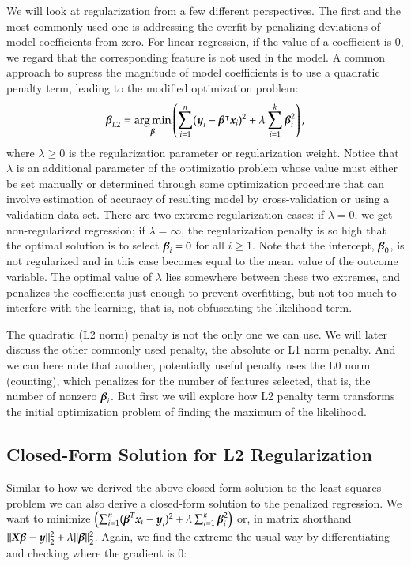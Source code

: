 \begin{refsection}
We will look at regularization from a few different perspectives. The first and the most commonly used one is addressing the overfit by penalizing deviations of model coefficients from zero. For linear regression, if the value of a coefficient is 0, we regard that the corresponding feature is not used in the model. A common approach to supress the magnitude of model coefficients is to use a quadratic penalty term, leading to the modified optimization problem:
$$
\boldsymbol{\beta}_{L2} = \operatorname*{arg\,min}_{\boldsymbol{\beta}} \left(\sum_{i=1}^n (\boldsymbol{y}_i - \boldsymbol{\beta}^\intercal\boldsymbol{x}_i )^2 + \lambda \sum_{i=1}^k \boldsymbol{\beta}_i^2\right),
$$
where $\lambda \geq 0$ is the regularization parameter or regularization weight. Notice that $\lambda$ is an additional parameter of the optimizatio problem whose value must either be set manually or determined through some optimization procedure that can involve estimation of accuracy of resulting model by cross-validation or using a validation data set. There are two extreme regularization cases: if $\lambda = 0$, we get non-regularized regression; if $\lambda=\infty$, the regularization penalty is so high that the optimal solution is to select $\boldsymbol{\beta}_i = 0$ for all $i\geq 1$. Note that the intercept, $\boldsymbol{\beta}_0$, is not regularized and in this case becomes equal to the mean value of the outcome variable. The optimal value of $\lambda$ lies somewhere between these two extremes, and penalizes the coefficients just enough to prevent overfitting, but not too much to interfere with the learning, that is, not obfuscating the likelihood term.

The quadratic (L2 norm) penalty is not the only one we can use. We will later discuss the other commonly used penalty, the absolute or L1 norm penalty. And we can here note that another, potentially useful penalty uses the L0 norm (counting), which penalizes for the number of features selected, that is, the number of nonzero $\boldsymbol{\beta}_i$. But first we will explore how L2 penalty term transforms the initial optimization problem of finding the maximum of the likelihood.

\subsection*{Closed-Form Solution for L2 Regularization}

Similar to how we derived the above closed-form solution to the least squares problem we can also derive a closed-form solution to the penalized regression. We want to minimize $\left(\sum_{i=1}^n (\boldsymbol{\beta}^T\boldsymbol{x}_i - \boldsymbol{y}_i)^2 + \lambda \sum_{i=1}^k \boldsymbol{\beta}_i^2\right)$ or, in matrix shorthand $\lVert \boldsymbol{X}\boldsymbol{\beta} - \boldsymbol{y} \rVert^2_2 + \lambda\lVert \boldsymbol{\beta} \rVert^2_2$. Again, we find the extreme the usual way by differentiating and checking where the gradient is 0:


\end{refsection}

